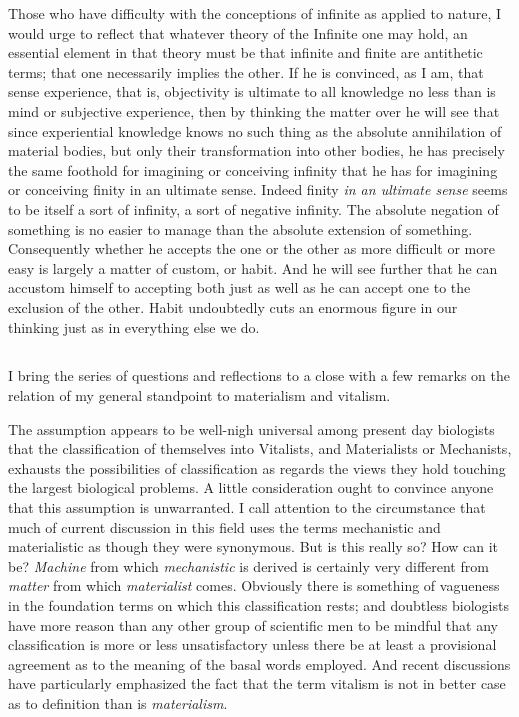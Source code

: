 \documentclass[a4paper, 11pt, oneside, polutonikogreek, english]{article}
\begin{document}
Those who have difficulty with the conceptions of infinite as applied to nature, I would urge to reflect that whatever theory of the Infinite one may hold, an essential element in that theory must be that infinite and finite are antithetic terms; that one necessarily implies the other. If he is convinced, as I am, that sense experience, that is, objectivity is ultimate to all knowledge no less than is mind or subjective experience, then by thinking the matter over he will see that since experiential knowledge knows no such thing as the absolute annihilation of material bodies, but only their transformation into other bodies, he has precisely the same foothold for imagining or conceiving infinity that he has for imagining or conceiving finity in an ultimate sense. Indeed finity \emph{in an ultimate sense} seems to be itself a sort of infinity, a sort of negative infinity. The absolute negation of something is no easier to manage than the absolute extension of something. Consequently whether he accepts the one or the other as more difficult or more easy is largely a matter of custom, or habit. And he will see further that he can accustom himself to accepting both just as well as he can accept one to the exclusion of the other. Habit undoubtedly cuts an enormous figure in our thinking just as in everything else we do.

\subsection{}
\paragraph{}
I bring the series of questions and reflections to a close with a few remarks on the relation of my general standpoint to materialism and vitalism.

The assumption appears to be well-nigh universal among present day biologists that the classification of themselves into Vitalists, and Materialists or Mechanists, exhausts the possibilities of classification as regards the views they hold touching the largest biological problems. A little consideration ought to convince anyone that this assumption is unwarranted. I call attention to the circumstance that much of current discussion in this field uses the terms mechanistic and materialistic as though they were synonymous. But is this really so? How can it be? \emph{Machine} from which \emph{mechanistic} is derived is certainly very different from \emph{matter} from which \emph{materialist} comes. Obviously there is something of vagueness in the foundation terms on which this classification rests; and doubtless biologists have more reason than any other group of scientific men to be mindful that any classification is more or less unsatisfactory unless there be at least a provisional agreement as to the meaning of the basal words employed. And recent discussions have particularly emphasized the fact that the term vitalism is not in better case as to definition than is \emph{materialism}.
\end{document}

